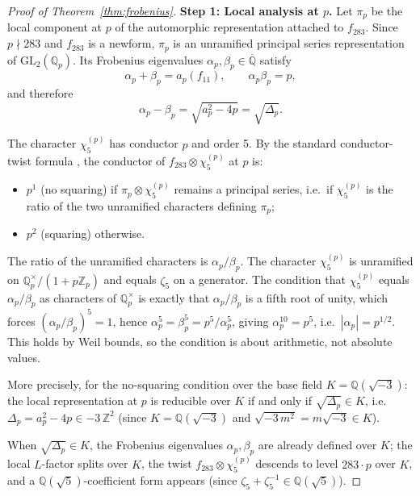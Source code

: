 \begin{proof}[Proof of Theorem~\ref{thm:frobenius}]

\textbf{Step 1: Local analysis at $p$.}
Let $\pi_p$ be the local component at $p$ of the automorphic representation
attached to $f_{283}$. Since $p \nmid 283$ and $f_{283}$ is a newform,
$\pi_p$ is an unramified principal series representation of
$\mathrm{GL}_2(\mathbb{Q}_p)$.
Its Frobenius eigenvalues $\alpha_p, \beta_p \in \overline{\mathbb{Q}}$
satisfy
\[
  \alpha_p + \beta_p = a_p(f_{11}), \qquad
  \alpha_p \beta_p = p,
\]
and therefore
\[
  \alpha_p - \beta_p = \sqrt{a_p^2 - 4p} = \sqrt{\Delta_p}.
\]

The character $\chi_5^{(p)}$ has conductor $p$ and order 5. By the
standard conductor-twist formula \cite{IwaniecKowalski}, the conductor
of $f_{283} \otimes \chi_5^{(p)}$ at $p$ is:
\begin{itemize}
  \item $p^1$ (no squaring) if $\pi_p \otimes \chi_5^{(p)}$ remains
        a principal series, i.e.\ if $\chi_5^{(p)}$ is the ratio of
        the two unramified characters defining $\pi_p$;
  \item $p^2$ (squaring) otherwise.
\end{itemize}

The ratio of the unramified characters is $\alpha_p / \beta_p$.
The character $\chi_5^{(p)}$ is unramified on $\mathbb{Q}_p^\times / (1 + p\mathbb{Z}_p)$
and equals $\zeta_5$ on a generator. The condition that $\chi_5^{(p)}$
equals $\alpha_p / \beta_p$ as characters of $\mathbb{Q}_p^\times$ is
exactly that $\alpha_p / \beta_p$ is a fifth root of unity, which forces
$(\alpha_p / \beta_p)^5 = 1$, hence $\alpha_p^5 = \beta_p^5 = p^5 / \alpha_p^5$,
giving $\alpha_p^{10} = p^5$, i.e.\ $|\alpha_p| = p^{1/2}$. This holds
by Weil bounds, so the condition is about arithmetic, not absolute values.

More precisely, for the no-squaring condition over the base field
$K = \mathbb{Q}(\sqrt{-3})$: the local representation at $p$ is reducible
over $K$ if and only if $\sqrt{\Delta_p} \in K$, i.e.\
$\Delta_p = a_p^2 - 4p \in -3\,\mathbb{Z}^2$ (since $K = \mathbb{Q}(\sqrt{-3})$
and $\sqrt{-3\,m^2} = m\sqrt{-3} \in K$).

When $\sqrt{\Delta_p} \in K$, the Frobenius eigenvalues $\alpha_p, \beta_p$
are already defined over $K$; the local $L$-factor splits over $K$,
the twist $f_{283} \otimes \chi_5^{(p)}$ descends to level $283 \cdot p$
over $K$, and a $\mathbb{Q}(\sqrt{5})$-coefficient form appears
(since $\zeta_5 + \zeta_5^{-1} \in \mathbb{Q}(\sqrt{5})$).


\end{proof}
